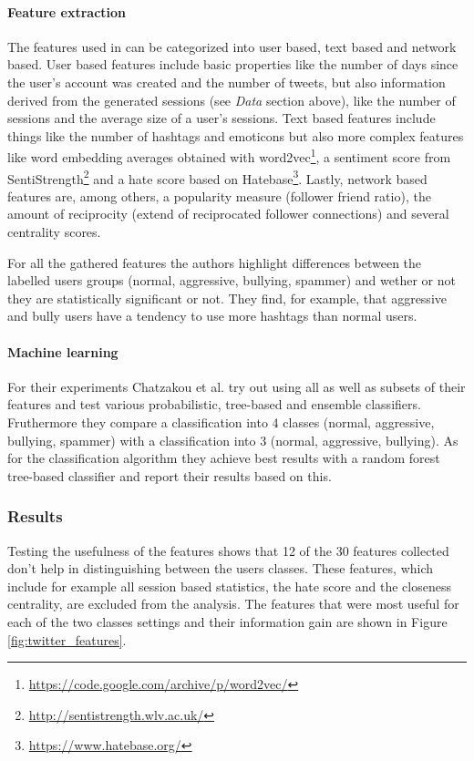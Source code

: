 \documentclass{proseminar}
\begin{document}
\paragraph{Feature extraction} The features used in \cite{Twitter:2017} can be categorized into user based, text based and network based. User based features include basic properties like the number of days since the user's account was created and the number of tweets, but also information derived from the generated sessions (see \emph{Data} section above), like the number of sessions and the average size of a user's sessions. Text based features include things like the number of hashtags and emoticons but also more complex features like word embedding averages obtained with word2vec\footnote{\url{https://code.google.com/archive/p/word2vec/}}, a sentiment score from SentiStrength\footnote{\url{http://sentistrength.wlv.ac.uk/}} and a hate score based on Hatebase\footnote{\url{https://www.hatebase.org/}}. Lastly, network based features are, among others, a popularity measure (follower friend ratio), the amount of reciprocity (extend of reciprocated follower connections) and several centrality scores.

For all the gathered features the authors highlight differences between the labelled users groups (normal, aggressive, bullying, spammer) and wether or not they are statistically significant or not. They find, for example, that aggressive and bully users have a tendency to use more hashtags than normal users.


\paragraph{Machine learning} For their experiments Chatzakou et al. try out using all as well as subsets of their features and test various probabilistic, tree-based and ensemble classifiers. Fruthermore they compare a classification into 4 classes (normal, aggressive, bullying, spammer) with a classification into 3 (normal, aggressive, bullying). As for the classification algorithm they achieve best results with a random forest tree-based classifier and report their results based on this.

\subsubsection{Results} Testing the usefulness of the features shows that 12 of the 30 features collected don't help in distinguishing between the users classes. These features, which include for example all session based statistics, the hate score and the closeness centrality, are excluded from the analysis. The features that were most useful for each of the two classes settings and their information gain are shown in Figure \ref{fig:twitter_features}.
\end{document}
